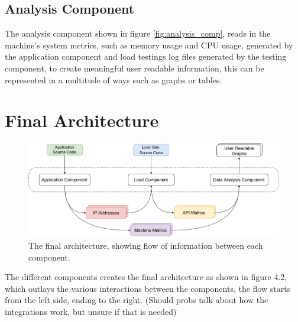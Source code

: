 \subsection{Analysis Component}

The analysis component shown in figure \ref{fig:analysis_comp}, reads in the machine's system metrics, such as memory usage and CPU usage, generated by the application component and load testings log files generated by the testing component, to create meaningful user readable information, this can be represented in a multitude of ways such as graphs or tables. 

\section{Final Architecture}
\begin{figure}[H]
    \centering
    \includegraphics[width=1\linewidth]{images/final_arch.pdf}
    \caption{The final architecture, showing flow of information between each component.}
    \label{fig:final_arch}
\end{figure} 
The different components creates the final architecture as shown in figure 4.2, which outlays the various interactions between the components, the flow starts from the left side, ending to the right. (Should probs talk about how the integrations work, but unsure if that is needed) 


